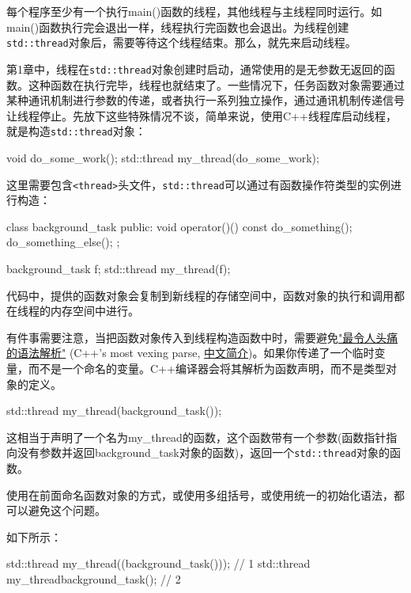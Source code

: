 
每个程序至少有一个执行main()函数的线程，其他线程与主线程同时运行。如main()函数执行完会退出一样，线程执行完函数也会退出。为线程创建\texttt{std::thread}对象后，需要等待这个线程结束。那么，就先来启动线程。


第1章中，线程在\texttt{std::thread}对象创建时启动，通常使用的是无参数无返回的函数。这种函数在执行完毕，线程也就结束了。一些情况下，任务函数对象需要通过某种通讯机制进行参数的传递，或者执行一系列独立操作，通过通讯机制传递信号让线程停止。先放下这些特殊情况不谈，简单来说，使用C++线程库启动线程，就是构造\texttt{std::thread}对象：

\begin{cpp}
void do_some_work();
std::thread my_thread(do_some_work);
\end{cpp}

这里需要包含\texttt{<thread>}头文件，\texttt{std::thread}可以通过有函数操作符类型的实例进行构造：

\begin{cpp}
class background_task
{
public:
  void operator()() const
  {
    do_something();
    do_something_else();
  }
};

background_task f;
std::thread my_thread(f);
\end{cpp}

代码中，提供的函数对象会复制到新线程的存储空间中，函数对象的执行和调用都在线程的内存空间中进行。

有件事需要注意，当把函数对象传入到线程构造函数中时，需要避免\href{http://en.wikipedia.org/wiki/Most_vexing_parse}{"最令人头痛的语法解析"} (C++’s most vexing parse, \href{http://qiezhuifeng.diandian.com/post/2012-08-27/40038339477}{中文简介})。如果你传递了一个临时变量，而不是一个命名的变量。C++编译器会将其解析为函数声明，而不是类型对象的定义。

\begin{cpp}
std::thread my_thread(background_task());
\end{cpp}

这相当于声明了一个名为my\_thread的函数，这个函数带有一个参数(函数指针指向没有参数并返回background\_task对象的函数)，返回一个\texttt{std::thread}对象的函数。

使用在前面命名函数对象的方式，或使用多组括号，或使用统一的初始化语法，都可以避免这个问题。

如下所示：

\begin{cpp}
std::thread my_thread((background_task()));  // 1
std::thread my_thread{background_task()};    // 2
\end{cpp}

